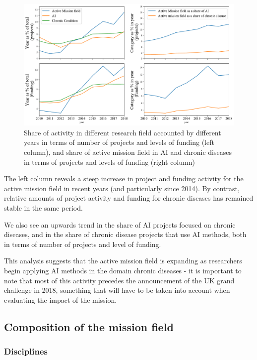 \documentclass[11pt]{article}
\begin{document}
\begin{figure}[!ht]
    \centering
    \includegraphics[width=\textwidth]{figures/fig_7_trends.pdf}
    \caption{Share of activity in different research field accounted by different years in terms of number of projects and levels of funding (left column), and share of active mission field in AI and chronic diseases in terms of projects and levels of funding (right column)}
    \label{fig:trends}
\end{figure}

The left column reveals a steep increase in project and funding activity for the active mission field in recent years (and particularly since 2014). By contrast, relative amounts of project activity and funding for chronic diseases has remained stable in the same period.

We also see an upwards trend in the share of AI projects focused on chronic diseases, and in the share of chronic disease projects that use AI methods, both in terms of number of projects and level of funding.

This analysis suggests that the active mission field is expanding as researchers begin applying AI methods in the domain chronic diseases - it is important to note that most of this activity precedes the announcement of the UK grand challenge in 2018, something that will have to be taken into account when evaluating the impact of the mission.

\subsection{Composition of the mission field}

\subsubsection{Disciplines}
\end{document}
